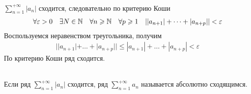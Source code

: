 \begin{Proof}~\\
	$\sum^{+\infty}_{n=1}|a_n|$ сходится, следовательно  по критерию Коши 
    \begin{gather*}
        \forall \varepsilon > 0 \quad \exists N \in \mathbb{N} \quad \forall n \geqslant \mathbb{N} \quad \forall p \geqslant 1 \quad ||a_{n+1}| + \dots + |a_{n+p}|| < \varepsilon
    \end{gather*}
    Воспользуемся неравенством треугольника, получим
    \begin{gather*}
        ||a_{n+1}| + \dots + |a_{n+p}|| \leq |a_{n+1}| + \dots + |a_{n+p}| < \varepsilon
    \end{gather*}
	По критерию Коши ряд сходится.
\end{Proof}

\begin{Def}~\\
	Если ряд $\sum^{+\infty}_{n=1}|a_n|$ сходится, ряд $\sum^{+\infty}_{n=1} a_n$ называется абсолютно сходящимся.
\end{Def}